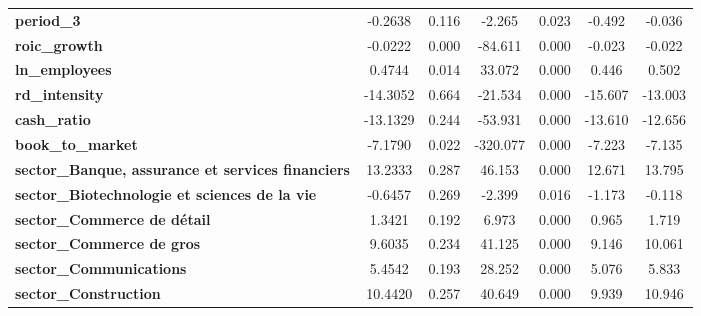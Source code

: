 \begin{center}
\begin{tabular}{lcccccc}
\textbf{period\_3}                                                    &      -0.2638  &        0.116     &    -2.265  &         0.023        &       -0.492    &       -0.036     \\
\textbf{roic\_growth}                                                 &      -0.0222  &        0.000     &   -84.611  &         0.000        &       -0.023    &       -0.022     \\
\textbf{ln\_employees}                                                &       0.4744  &        0.014     &    33.072  &         0.000        &        0.446    &        0.502     \\
\textbf{rd\_intensity}                                                &     -14.3052  &        0.664     &   -21.534  &         0.000        &      -15.607    &      -13.003     \\
\textbf{cash\_ratio}                                                  &     -13.1329  &        0.244     &   -53.931  &         0.000        &      -13.610    &      -12.656     \\
\textbf{book\_to\_market}                                             &      -7.1790  &        0.022     &  -320.077  &         0.000        &       -7.223    &       -7.135     \\
\textbf{sector\_Banque, assurance et services financiers}             &      13.2333  &        0.287     &    46.153  &         0.000        &       12.671    &       13.795     \\
\textbf{sector\_Biotechnologie et sciences de la vie}                 &      -0.6457  &        0.269     &    -2.399  &         0.016        &       -1.173    &       -0.118     \\
\textbf{sector\_Commerce de détail}                                   &       1.3421  &        0.192     &     6.973  &         0.000        &        0.965    &        1.719     \\
\textbf{sector\_Commerce de gros}                                     &       9.6035  &        0.234     &    41.125  &         0.000        &        9.146    &       10.061     \\
\textbf{sector\_Communications}                                       &       5.4542  &        0.193     &    28.252  &         0.000        &        5.076    &        5.833     \\
\textbf{sector\_Construction}                                         &      10.4420  &        0.257     &    40.649  &         0.000        &        9.939    &       10.946     \\

\end{tabular}
\end{center}
